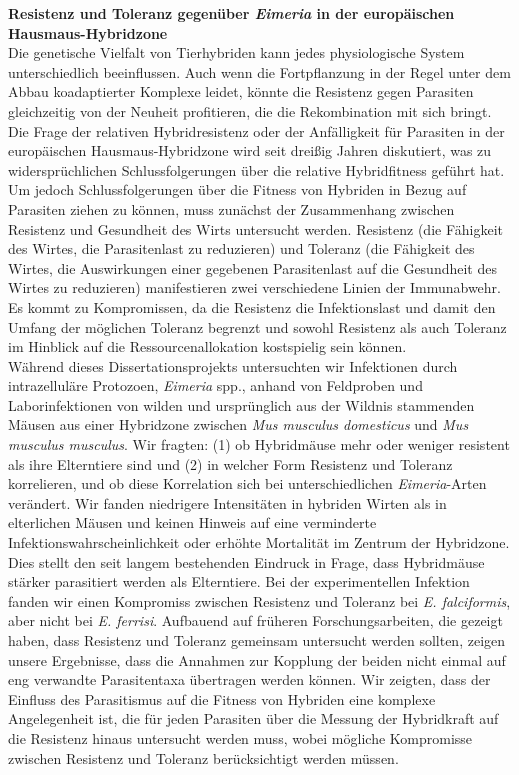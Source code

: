 \textbf{Resistenz und Toleranz gegenüber \textit{Eimeria} in der europäischen Hausmaus-Hybridzone} \\

Die genetische Vielfalt von Tierhybriden kann jedes physiologische System unterschiedlich beeinflussen. Auch wenn die Fortpflanzung in der Regel unter dem Abbau koadaptierter Komplexe leidet, könnte die Resistenz gegen Parasiten gleichzeitig von der Neuheit profitieren, die die Rekombination mit sich bringt. Die Frage der relativen Hybridresistenz oder der Anfälligkeit für Parasiten in der europäischen Hausmaus-Hybridzone wird seit dreißig Jahren diskutiert, was zu widersprüchlichen Schlussfolgerungen über die relative Hybridfitness geführt hat. Um jedoch Schlussfolgerungen über die Fitness von Hybriden in Bezug auf Parasiten ziehen zu können, muss zunächst der Zusammenhang zwischen Resistenz und Gesundheit des Wirts untersucht werden. Resistenz (die Fähigkeit des Wirtes, die Parasitenlast zu reduzieren) und Toleranz (die Fähigkeit des Wirtes, die Auswirkungen einer gegebenen Parasitenlast auf die Gesundheit des Wirtes zu reduzieren) manifestieren zwei verschiedene Linien der Immunabwehr. Es kommt zu Kompromissen, da die Resistenz die Infektionslast und damit den Umfang der möglichen Toleranz begrenzt und sowohl Resistenz als auch Toleranz im Hinblick auf die Ressourcenallokation kostspielig sein können. \\
Während dieses Dissertationsprojekts untersuchten wir Infektionen durch intrazelluläre Protozoen, \textit{Eimeria} spp., anhand von Feldproben und Laborinfektionen von wilden und ursprünglich aus der Wildnis stammenden Mäusen aus einer Hybridzone zwischen \textit{Mus musculus domesticus} und \textit{Mus musculus musculus}. Wir fragten: (1) ob Hybridmäuse mehr oder weniger resistent als ihre Elterntiere sind und (2) in welcher Form Resistenz und Toleranz korrelieren, und ob diese Korrelation sich bei unterschiedlichen \textit{Eimeria}-Arten verändert. Wir fanden niedrigere Intensitäten in hybriden Wirten als in elterlichen Mäusen und keinen Hinweis auf eine verminderte Infektionswahrscheinlichkeit oder erhöhte Mortalität im Zentrum der Hybridzone. Dies stellt den seit langem bestehenden Eindruck in Frage, dass Hybridmäuse stärker parasitiert werden als Elterntiere. Bei der experimentellen Infektion fanden wir einen Kompromiss zwischen Resistenz und Toleranz bei \textit{E. falciformis}, aber nicht bei \textit{E. ferrisi}. Aufbauend auf früheren Forschungsarbeiten, die gezeigt haben, dass Resistenz und Toleranz gemeinsam untersucht werden sollten, zeigen unsere Ergebnisse, dass die Annahmen zur Kopplung der beiden nicht einmal auf eng verwandte Parasitentaxa übertragen werden können. Wir zeigten, dass der Einfluss des Parasitismus auf die Fitness von Hybriden eine komplexe Angelegenheit ist, die für jeden Parasiten über die Messung der Hybridkraft auf die Resistenz hinaus untersucht werden muss, wobei mögliche Kompromisse zwischen Resistenz und Toleranz berücksichtigt werden müssen.
